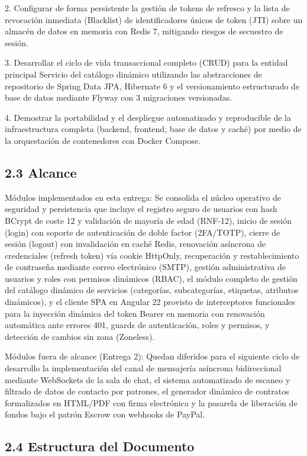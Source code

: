 \documentclass[
]{article}
\begin{document}
2. Configurar de forma persistente la gestión de tokens de refresco y la
lista de revocación inmediata (Blacklist) de identificadores únicos de
token (JTI) sobre un almacén de datos en memoria con Redis 7, mitigando
riesgos de secuestro de sesión.

3. Desarrollar el ciclo de vida transaccional completo (CRUD) para la
entidad principal Servicio del catálogo dinámico utilizando las
abstracciones de repositorio de Spring Data JPA, Hibernate 6 y el
versionamiento estructurado de base de datos mediante Flyway con 3
migraciones versionadas.

4. Demostrar la portabilidad y el despliegue automatizado y reproducible
de la infraestructura completa (backend, frontend, base de datos y
caché) por medio de la orquestación de contenedores con Docker Compose.

\subsection{2.3 Alcance}

Módulos implementados en esta entrega: Se consolida el núcleo operativo
de seguridad y persistencia que incluye el registro seguro de usuarios
con hash BCrypt de coste 12 y validación de mayoría de edad (RNF-12),
inicio de sesión (login) con soporte de autenticación de doble factor
(2FA/TOTP), cierre de sesión (logout) con invalidación en caché Redis,
renovación asíncrona de credenciales (refresh token) vía cookie
HttpOnly, recuperación y restablecimiento de contraseña mediante correo
electrónico (SMTP), gestión administrativa de usuarios y roles con
permisos dinámicos (RBAC), el módulo completo de gestión del catálogo
dinámico de servicios (categorías, subcategorías, etiquetas, atributos
dinámicos), y el cliente SPA en Angular 22 provisto de interceptores
funcionales para la inyección dinámica del token Bearer en memoria con
renovación automática ante errores 401, guards de autenticación, roles y
permisos, y detección de cambios sin zona (Zoneless).

Módulos fuera de alcance (Entrega 2): Quedan diferidos para el siguiente
ciclo de desarrollo la implementación del canal de mensajería asíncrona
bidireccional mediante WebSockets de la sala de chat, el sistema
automatizado de escaneo y filtrado de datos de contacto por patrones, el
generador dinámico de contratos formalizados en HTML/PDF con firma
electrónica y la pasarela de liberación de fondos bajo el patrón Escrow
con webhooks de PayPal.

\subsection{2.4 Estructura del
Documento}
\end{document}
